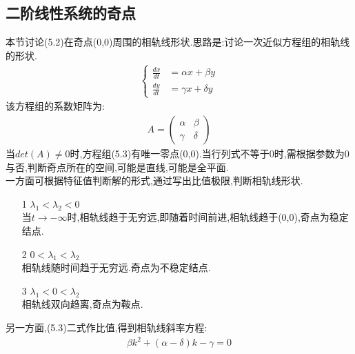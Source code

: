 \documentclass[12pt, a4paper, oneside]{ctexbook}
\begin{document}
    \subsection{二阶线性系统的奇点}
    本节讨论(5.2)在奇点(0,0)周围的相轨线形状.思路是:讨论一次近似方程组的相轨线的形状.\\
    \begin{equation}
        \begin{aligned}
            \begin{cases}
                \frac{dx}{dt} &= \alpha x + \beta y \\
                \frac{dy}{dt} &= \gamma x + \delta y
            \end{cases}
        \end{aligned}
    \end{equation}
    该方程组的系数矩阵为:
    \begin{align}
        A=\begin{pmatrix}
            \alpha&\beta\\\gamma&\delta
        \end{pmatrix}
    \end{align}
    当$ det(A)\neq 0$时,方程组(5.3)有唯一零点(0,0).当行列式不等于0时,需根据参数为0与否,判断奇点所在的空间,可能是直线,可能是全平面.\\
    一方面可根据特征值判断解的形式,通过写出比值极限,判断相轨线形状.\\
    \begin{enumerate}
        \item[1] $\lambda_1<\lambda_2<0$\\当$t\rightarrow-\infty$时,相轨线趋于无穷远,即随着时间前进,相轨线趋于(0,0),奇点为稳定结点.
        \item[2] $0<\lambda_1<\lambda_2$\\相轨线随时间趋于无穷远.奇点为不稳定结点.
        \item[3] $\lambda_1<0<\lambda_2$\\相轨线双向趋离,奇点为鞍点.
    \end{enumerate}
    另一方面,(5.3)二式作比值,得到相轨线斜率方程:
    \begin{align}
        \beta k^2+(\alpha-\delta)k-\gamma=0
    \end{align}
\end{document}
